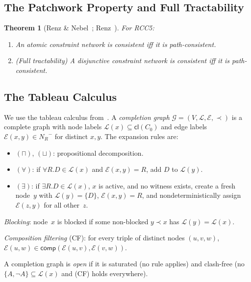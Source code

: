 \documentclass[a4paper,11pt]{article}
\newtheorem{theorem}{Theorem}[section]
\theoremstyle{definition}
\newcommand{\NR}{\ensuremath{N_R}}
\newcommand{\comp}{\ensuremath{\mathsf{comp}}}
\newcommand{\cl}{\ensuremath{\mathsf{cl}}}
\begin{document}
\subsection{The Patchwork Property and Full Tractability}

\begin{theorem}[Renz \& Nebel~\cite{RenzNebel1999}; Renz~\cite{Renz1999}]
\label{thm:patchwork}
For RCC5:
\begin{enumerate}[nosep,label=(\roman*)]
  \item An atomic constraint network is consistent iff it is
    path-consistent.
  \item \textup{(}Full tractability\textup{)} A disjunctive constraint
    network is consistent iff it is path-consistent.
\end{enumerate}
\end{theorem}

\subsection{The Tableau Calculus}

We use the tableau calculus from~\cite[Section~7]{CompanionPaper}.
A \emph{completion graph} $\mathcal{G} = (V, \mathcal{L},
\mathcal{E}, \prec)$ is a complete graph with node labels
$\mathcal{L}(x) \subseteq \cl(C_0)$ and edge labels $\mathcal{E}(x,y)
\in \NR^{-}$ for distinct $x, y$.  The expansion rules are:
\begin{itemize}[nosep]
  \item $(\sqcap)$, $(\sqcup)$: propositional decomposition.
  \item $(\forall)$: if $\forall R.D \in \mathcal{L}(x)$ and
    $\mathcal{E}(x,y) = R$, add $D$ to $\mathcal{L}(y)$.
  \item $(\exists)$: if $\exists R.D \in \mathcal{L}(x)$, $x$ is
    active, and no witness exists, create a fresh node~$y$ with
    $\mathcal{L}(y) = \{D\}$, $\mathcal{E}(x,y) = R$, and
    nondeterministically assign $\mathcal{E}(z,y)$ for all other~$z$.
\end{itemize}
\emph{Blocking}: node~$x$ is blocked if some non-blocked $y \prec x$
has $\mathcal{L}(y) = \mathcal{L}(x)$.

\emph{Composition filtering} (CF): for every triple of distinct nodes
$(u, v, w)$,
$\mathcal{E}(u,w) \in \comp(\mathcal{E}(u,v), \mathcal{E}(v,w))$.

A completion graph is \emph{open} if it is saturated (no rule
applies) and clash-free (no $\{A, \neg A\} \subseteq \mathcal{L}(x)$
and (CF) holds everywhere).
\end{document}
